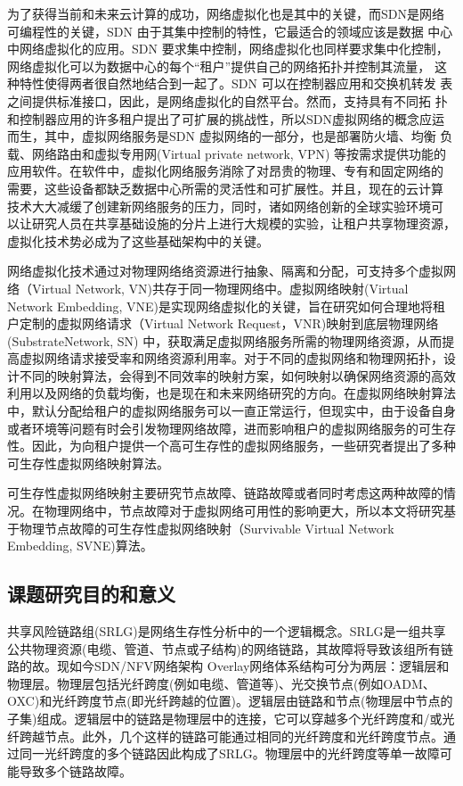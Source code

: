 为了获得当前和未来云计算的成功，网络虚拟化也是其中的关键，而SDN是网络可编程性的关键，SDN 由于其集中控制的特性，它最适合的领域应该是数据 中心中网络虚拟化的应用。SDN 要求集中控制，网络虚拟化也同样要求集中化控制，网络虚拟化可以为数据中心的每个“租户”提供自己的网络拓扑并控制其流量， 这种特性使得两者很自然地结合到一起了。SDN 可以在控制器应用和交换机转发 表之间提供标准接口，因此，是网络虚拟化的自然平台。然而，支持具有不同拓 扑和控制器应用的许多租户提出了可扩展的挑战性，所以SDN虚拟网络的概念应运而生，其中，虚拟网络服务是SDN 虚拟网络的一部分，也是部署防火墙、均衡 负载、网络路由和虚拟专用网(Virtual private network, VPN) 等按需求提供功能的 应用软件。在软件中，虚拟化网络服务消除了对昂贵的物理、专有和固定网络的 需要，这些设备都缺乏数据中心所需的灵活性和可扩展性。并且，现在的云计算 技术大大减缓了创建新网络服务的压力，同时，诸如网络创新的全球实验环境可 以让研究人员在共享基础设施的分片上进行大规模的实验，让租户共享物理资源， 虚拟化技术势必成为了这些基础架构中的关键。



网络虚拟化\cite{chowdhury2009network}技术通过对物理网络络资源进行抽象、隔离和分配，可支持多个虚拟网络（Virtual Network, VN)共存于同一物理网络中。虚拟网络映射\cite{fischer2013virtual}(Virtual Network Embedding, VNE)是实现网络虚拟化的关键，旨在研究如何合理地将租户定制的虚拟网络请求（Virtual Network Request，VNR)映射到底层物理网络 (SubstrateNetwork, SN) 中，获取满足虚拟网络服务所需的物理网络资源，从而提高虚拟网络请求接受率和网络资源利用率。对于不同的虚拟网络和物理网拓扑，设计不同的映射算法，会得到不同效率的映射方案，如何映射以确保网络资源的高效利用以及网络的负载均衡，也是现在和未来网络研究的方向。在虚拟网络映射算法中，默认分配给租户的虚拟网络服务可以一直正常运行，但现实中，由于设备自身或者环境等问题有时会引发物理网络故障，进而影响租户的虚拟网络服务的可生存性。因此，为向租户提供一个高可生存性的虚拟网络服务，一些研究者提出了多种可生存性虚拟网络映射算法\cite{herker2013survey}。

可生存性虚拟网络映射主要研究节点故障、链路故障或者同时考虑这两种故障的情况。在物理网络中，节点故障对于虚拟网络可用性的影响更大，所以本文将研究基于物理节点故障的可生存性虚拟网络映射（Survivable Virtual Network Embedding, SVNE)算法。


\subsection{课题研究目的和意义}
共享风险链路组(SRLG)是网络生存性分析中的一个逻辑概念。SRLG是一组共享公共物理资源(电缆、管道、节点或子结构)的网络链路，其故障将导致该组所有链路的故。现如今SDN/NFV网络架构 Overlay网络体系结构可分为两层：逻辑层和物理层。物理层包括光纤跨度(例如电缆、管道等)、光交换节点(例如OADM、OXC)和光纤跨度节点(即光纤跨越的位置)。逻辑层由链路和节点(物理层中节点的子集)组成。逻辑层中的链路是物理层中的连接，它可以穿越多个光纤跨度和/或光纤跨越节点。此外，几个这样的链路可能通过相同的光纤跨度和光纤跨度节点。通过同一光纤跨度的多个链路因此构成了SRLG。物理层中的光纤跨度等单一故障可能导致多个链路故障。

